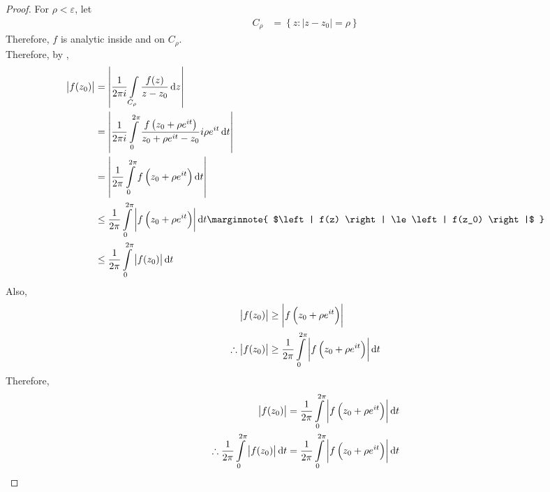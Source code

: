 \documentclass[titlepage, fleqn, a4paper, 12pt, twoside]{article}
\theoremstyle{definition}
\theoremstyle{theorem}
\begin{document}
\begin{proof}
	For $\rho < \varepsilon$, let
	\begin{align*}
		C_{\rho} & = \left\{ z : |z - z_0| = \rho \right\}
	\end{align*}
	Therefore, $f$ is analytic inside and on $C_{\rho}$.\\
	Therefore, by ,
	\begin{align*}
		\left| f(z_0) \right|  & = \left| \frac{1}{2 \pi i} \int\limits_{C_{\rho}} \frac{f(z)}{z - z_0} \dif z \right|                                                                \\
                                       & = \left| \frac{1}{2 \pi i} \int\limits_{0}^{2 \pi} \frac{f\left( z_0 + \rho e^{i t} \right)}{z_0 + \rho e^{i t} - z_0} i \rho e^{i t} \dif t \right| \\
                                       & = \left| \frac{1}{2 \pi} \int\limits_{0}^{2 \pi} f\left( z_0 + \rho e^{i t} \right) \dif t \right|                                                   \\
                                       & \le \frac{1}{2 \pi} \int\limits_{0}^{2 \pi} \left| f\left( z_0 + \rho e^{i t} \right) \right| \dif t
		\marginnote
		{
			$\left| f(z) \right| \le \left| f(z_0) \right|$
		}                     \\
                                       & \le \frac{1}{2 \pi} \int\limits_{0}^{2 \pi} \left| f(z_0) \right| \dif t                                                                             \\
	\end{align*}
	Also,
	\begin{align*}
		\left| f(z_0) \right|            & \ge \left| f\left( z_0 + \rho e^{i t} \right) \right| \\
		\therefore \left| f(z_0) \right| & \ge \frac{1}{2 \pi} \int\limits_{0}^{2 \pi} \left| f\left( z_0 + \rho e^{i t} \right) \right| \dif t
	\end{align*}
	Therefore,
	\begin{align*}
		\left| f(z_0) \right|                                                           & = \frac{1}{2 \pi} \int\limits_{0}^{2 \pi} \left| f\left(z_0 + \rho e^{i t} \right) \right| \dif t  \\
		\therefore \frac{1}{2 \pi} \int\limits_{0}^{2 \pi} \left| f(z_0) \right| \dif t & = \frac{1}{2 \pi} \int\limits_{0}^{2 \pi} \left| f\left( z_0 + \rho e^{i t} \right) \right| \dif t \\

\end{align*}
\end{proof}
\end{document}
